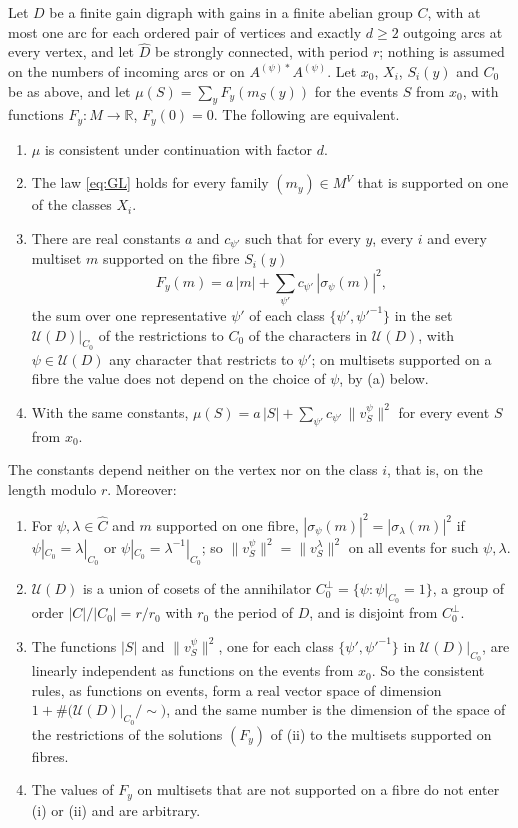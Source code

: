 \begin{theorem}\label{thm:periodic}
Let $D$ be a finite gain digraph with gains in a finite abelian group $C$, with at most one arc for each ordered pair of vertices and exactly $d\ge2$ outgoing arcs at every vertex, and let $\hat D$ be strongly connected, with period $r$; nothing is assumed on the numbers of incoming arcs or on $A^{(\psi)*}A^{(\psi)}$. Let $x_0$, $X_i$, $S_i(y)$ and $C_0$ be as above, and let $\mu(S)=\sum_yF_y(m_S(y))$ for the events $S$ from $x_0$, with functions $F_y\colon M\to\mathbb{R}$, $F_y(0)=0$. The following are equivalent.
\begin{enumerate}
\item[(i)] $\mu$ is consistent under continuation with factor $d$.
\item[(ii)] The law \eqref{eq:GL} holds for every family $(m_y)\in M^V$ that is supported on one of the classes $X_i$.
\item[(iii)] There are real constants $a$ and $c_{\psi'}$ such that for every $y$, every $i$ and every multiset $m$ supported on the fibre $S_i(y)$
\[
F_y(m)=a\,|m|+\sum_{\psi'}c_{\psi'}\,|\sigma_\psi(m)|^2 ,
\]
the sum over one representative $\psi'$ of each class $\{\psi',\psi'^{-1}\}$ in the set $\mathcal{U}(D)|_{C_0}$ of the restrictions to $C_0$ of the characters in $\mathcal{U}(D)$, with $\psi\in\mathcal{U}(D)$ any character that restricts to $\psi'$; on multisets supported on a fibre the value does not depend on the choice of $\psi$, by (a) below.
\item[(iv)] With the same constants, $\mu(S)=a\,|S|+\sum_{\psi'}c_{\psi'}\,\lVert v^\psi_S\rVert^2$ for every event $S$ from $x_0$.
\end{enumerate}
The constants depend neither on the vertex nor on the class $i$, that is, on the length modulo $r$. Moreover:
\begin{enumerate}
\item[(a)] For $\psi,\lambda\in\hat C$ and $m$ supported on one fibre, $|\sigma_\psi(m)|^2=|\sigma_\lambda(m)|^2$ if $\psi|_{C_0}=\lambda|_{C_0}$ or $\psi|_{C_0}=\lambda^{-1}|_{C_0}$; so $\lVert v^\psi_S\rVert^2=\lVert v^\lambda_S\rVert^2$ on all events for such $\psi,\lambda$.
\item[(b)] $\mathcal{U}(D)$ is a union of cosets of the annihilator $C_0^\perp=\{\psi:\psi|_{C_0}=1\}$, a group of order $|C|/|C_0|=r/r_0$ with $r_0$ the period of $D$, and is disjoint from $C_0^\perp$.
\item[(c)] The functions $|S|$ and $\lVert v^\psi_S\rVert^2$, one for each class $\{\psi',\psi'^{-1}\}$ in $\mathcal{U}(D)|_{C_0}$, are linearly independent as functions on the events from $x_0$. So the consistent rules, as functions on events, form a real vector space of dimension $1+\#\bigl(\mathcal{U}(D)|_{C_0}/\!\sim\bigr)$, and the same number is the dimension of the space of the restrictions of the solutions $(F_y)$ of (ii) to the multisets supported on fibres.
\item[(d)] The values of $F_y$ on multisets that are not supported on a fibre do not enter (i) or (ii) and are arbitrary.
\end{enumerate}
\end{theorem}

